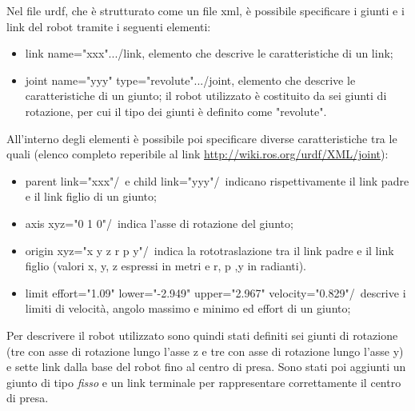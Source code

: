 Nel file urdf, che è strutturato come un file xml, è possibile specificare i giunti e i link del robot tramite i seguenti elementi:
\begin{itemize}
	\item \tl link name="xxx"\tr...\tl /link\tr, elemento che descrive le caratteristiche di un link;
	\item \tl joint name="yyy" type="revolute"\tr...\tl /joint\tr, elemento che descrive le caratteristiche di un giunto; il robot utilizzato è costituito da sei giunti di rotazione, per cui il tipo dei giunti è definito come "revolute".
\end{itemize}
All'interno degli elementi è possibile poi specificare diverse caratteristiche tra le quali (elenco completo reperibile al link \url{http://wiki.ros.org/urdf/XML/joint}):
\begin{itemize}
	\item  \tl parent link="xxx"/\tr\ e \tl child link="yyy"/\tr\ indicano rispettivamente il link padre e il link figlio di un giunto;
	\item \tl axis xyz="0 1 0"/\tr\ indica l'asse di rotazione del giunto;
	\item  \tl origin xyz="x y z r p y"/\tr\ indica la rototraslazione tra il link padre e il link figlio (valori x, y, z espressi in metri e r, p ,y in radianti).
	\item \tl limit effort="1.09" lower="-2.949" upper="2.967" velocity="0.829"/\tr \ descrive i limiti di velocità, angolo massimo e minimo ed effort di un giunto;
\end{itemize}
Per descrivere il robot utilizzato sono quindi stati definiti sei giunti di rotazione (tre con asse di rotazione lungo l'asse z e tre con asse di rotazione lungo l'asse y) e sette link dalla base del robot fino al centro di presa. Sono stati poi aggiunti un giunto di tipo \textit{fisso} e un link terminale per rappresentare correttamente il centro di presa.

\clearpage

